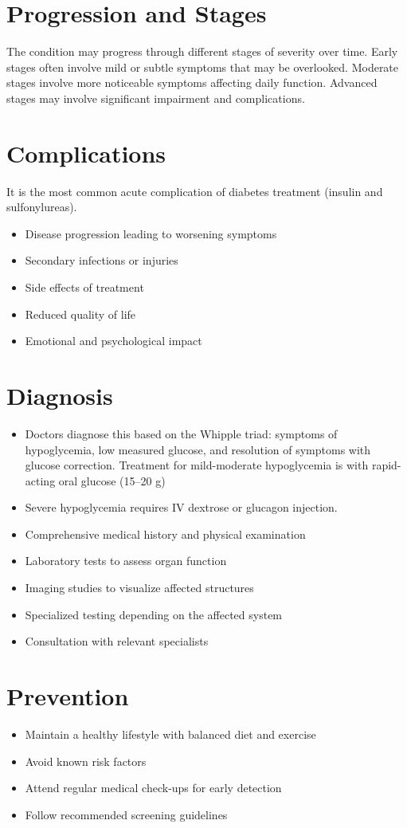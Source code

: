 \section{Progression and Stages}
The condition may progress through different stages of severity over time. Early stages often involve mild or subtle symptoms that may be overlooked. Moderate stages involve more noticeable symptoms affecting daily function. Advanced stages may involve significant impairment and complications.
\section{Complications}
It is the most common acute complication of diabetes treatment (insulin and sulfonylureas).

\begin{itemize}[noitemsep]
  \item Disease progression leading to worsening symptoms
  \item Secondary infections or injuries
  \item Side effects of treatment
  \item Reduced quality of life
  \item Emotional and psychological impact
\end{itemize}
\section{Diagnosis}
\begin{itemize}[noitemsep]
  \item Doctors diagnose this based on the Whipple triad: symptoms of hypoglycemia, low measured glucose, and resolution of symptoms with glucose correction. Treatment for mild-moderate hypoglycemia is with rapid-acting oral glucose (15--20 g)
  \item Severe hypoglycemia requires IV dextrose or glucagon injection.
  \item Comprehensive medical history and physical examination
  \item Laboratory tests to assess organ function
  \item Imaging studies to visualize affected structures
  \item Specialized testing depending on the affected system
  \item Consultation with relevant specialists
\end{itemize}
\section{Prevention}
\begin{itemize}[noitemsep]
  \item Maintain a healthy lifestyle with balanced diet and exercise
  \item Avoid known risk factors
  \item Attend regular medical check-ups for early detection
  \item Follow recommended screening guidelines
\end{itemize}

